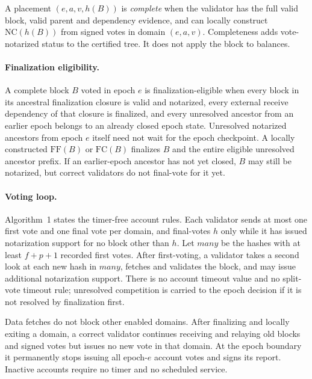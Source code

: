 \documentclass[10pt,twocolumn]{article}
\newcommand{\NC}{\mathrm{NC}}
\newcommand{\FC}{\mathrm{FC}}
\newcommand{\FF}{\mathrm{FF}}
\begin{document}
A placement $(e,a,v,h(B))$ is \emph{complete} when the validator has the full valid block, valid parent and dependency evidence, and can locally construct $\NC(h(B))$ from signed votes in domain $(e,a,v)$. Completeness adds vote-notarized status to the certified tree. It does not apply the block to balances.

\paragraph{Finalization eligibility.} A complete block $B$ voted in epoch $e$ is finalization-eligible when every block in its ancestral finalization closure is valid and notarized, every external receive dependency of that closure is finalized, and every unresolved ancestor from an earlier epoch belongs to an already closed epoch state. Unresolved notarized ancestors from epoch $e$ itself need not wait for the epoch checkpoint. A locally constructed $\FF(B)$ or $\FC(B)$ finalizes $B$ and the entire eligible unresolved ancestor prefix. If an earlier-epoch ancestor has not yet closed, $B$ may still be notarized, but correct validators do not final-vote for it yet.

\paragraph{Voting loop.} Algorithm~1 states the timer-free account rules. Each validator sends at most one first vote and one final vote per domain, and final-votes $h$ only while it has issued notarization support for no block other than $h$. Let $\mathit{many}$ be the hashes with at least $f+p+1$ recorded first votes. After first-voting, a validator takes a second look at each new hash in $\mathit{many}$, fetches and validates the block, and may issue additional notarization support. There is no account timeout value and no split-vote timeout rule; unresolved competition is carried to the epoch decision if it is not resolved by finalization first.

Data fetches do not block other enabled domains. After finalizing and locally exiting a domain, a correct validator continues receiving and relaying old blocks and signed votes but issues no new vote in that domain. At the epoch boundary it permanently stops issuing all epoch-$e$ account votes and signs its report. Inactive accounts require no timer and no scheduled service.
\end{document}
